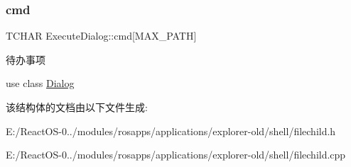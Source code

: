 \subsubsection{\texorpdfstring{cmd}{cmd}}
{\footnotesize\ttfamily T\+C\+H\+AR Execute\+Dialog\+::cmd\mbox{[}M\+A\+X\+\_\+\+P\+A\+TH\mbox{]}}

\begin{DoxyRefDesc}{待办事项}
\item[\hyperlink{todo__todo000033}{待办事项}]use class \hyperlink{struct_dialog}{Dialog} \end{DoxyRefDesc}


该结构体的文档由以下文件生成\+:\begin{DoxyCompactItemize}
\item 
E\+:/\+React\+O\+S-\/0../modules/rosapps/applications/explorer-\/old/shell/filechild.\+h\item 
E\+:/\+React\+O\+S-\/0../modules/rosapps/applications/explorer-\/old/shell/filechild.\+cpp\end{DoxyCompactItemize}
